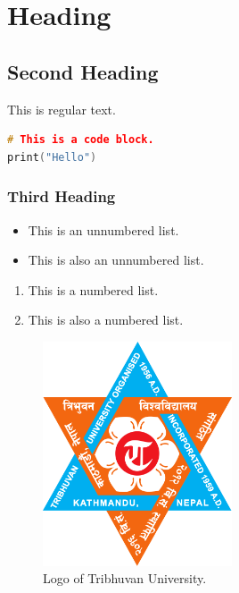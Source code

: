 \documentclass[12pt]{article}
\begin{document}
\makecover

\setupmain

\section{Heading}
\subsection{Second Heading}

This is regular text.

\begin{lstlisting}[language=C++]
# This is a code block.
print("Hello")
\end{lstlisting}

\subsubsection{Third Heading}

\begin{itemize}
    \item This is an unnumbered list.
    \item This is also an unnumbered list.
\end{itemize}

\begin{enumerate}
    \item This is a numbered list.
    \item This is also a numbered list.
\end{enumerate}

\begin{figure}[h]
    \centering
    \includegraphics[width=0.5\textwidth]{logo.png}
    \caption{Logo of Tribhuvan University.}
\end{figure}
\end{document}
